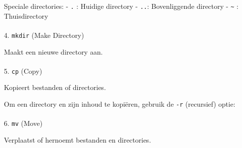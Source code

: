 \documentclass[
  letterpaper,
  DIV=11,
  numbers=noendperiod]{scrartcl}
\makeatletter
\let\oldparagraph\paragraph
\renewcommand{\paragraph}{
    \@ifstar
      \xxxParagraphStar
      \xxxParagraphNoStar
  }
\newcommand{\xxxParagraphStar}[1]{\oldparagraph*{#1}\mbox{}}
\newcommand{\xxxParagraphNoStar}[1]{\oldparagraph{#1}\mbox{}}
\newenvironment{Shaded}{\begin{snugshade}}{\end{snugshade}}
\newcommand{\AttributeTok}[1]{\textcolor[rgb]{0.40,0.45,0.13}{#1}}
\newcommand{\ExtensionTok}[1]{\textcolor[rgb]{0.00,0.23,0.31}{#1}}
\newcommand{\NormalTok}[1]{\textcolor[rgb]{0.00,0.23,0.31}{#1}}
\makeatother
\begin{document}
Speciale directories: - \texttt{.} : Huidige directory - \texttt{..}:
Bovenliggende directory - \texttt{\textasciitilde{}} : Thuisdirectory

\paragraph{\texorpdfstring{4. \texttt{mkdir} (Make
Directory)}{4. mkdir (Make Directory)}}\label{mkdir-make-directory}

Maakt een nieuwe directory aan.

\begin{Shaded}
\end{Shaded}

\paragraph{\texorpdfstring{5. \texttt{cp}
(Copy)}{5. cp (Copy)}}\label{cp-copy}

Kopieert bestanden of directories.

\begin{Shaded}
\end{Shaded}

Om een directory en zijn inhoud te kopiëren, gebruik de \texttt{-r}
(recursief) optie:

\begin{Shaded}
\end{Shaded}

\paragraph{\texorpdfstring{6. \texttt{mv}
(Move)}{6. mv (Move)}}\label{mv-move}

Verplaatst of hernoemt bestanden en directories.

\begin{Shaded}
\end{Shaded}
\end{document}
